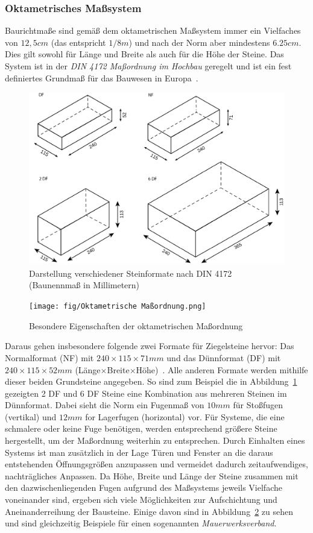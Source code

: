 \subsubsection*{Oktametrisches Maßsystem}
Baurichtmaße sind gemäß dem oktametrischen Maßsystem immer ein Vielfaches von \(12,5 cm\) (das entspricht \(1/8 m\)) und nach der Norm aber mindestens \(6.25cm\).
Dies gilt sowohl für Länge und Breite als auch für die Höhe der Steine.
Das System ist in der \textit{DIN 4172 Maßordnung im Hochbau} geregelt und ist ein fest definiertes Grundmaß für das Bauwesen in Europa~\cite{DIN417224}.
\begin{figure}[ht]
    \centering
    \includegraphics[width=0.8\columnwidth]{fig/Ziegelsteinformate DF NF 2DF 6DF.png}
    \caption{Darstellung verschiedener Steinformate nach DIN 4172 (Baunennmaß in Millimetern)~\cite{Steinfor38:online}}\label{fig:basics:Steinformate}
\end{figure}
\begin{figure}[hb]
  \centering
  \texttt{[image: fig/Oktametrische Maßordnung.png]}
  \caption{Besondere Eigenschaften der oktametrischen Maßordnung~\cite{Moro2021}}\label{fig:basics:OktametrischeMassordnung}
\end{figure}
Daraus gehen insbesondere folgende zwei Formate für Ziegelsteine hervor:
Das Normalformat (NF) mit \(240\times115\times71 mm\) und das Dünnformat (DF) mit \(240\times115\times52 mm\) (Länge$\times$Breite$\times$Höhe)~\cite{Moro2021}.
Alle anderen Formate werden mithilfe dieser beiden Grundsteine angegeben.
So sind zum Beispiel die in Abbildung~\ref{fig:basics:Steinformate} gezeigten 2 DF und 6 DF Steine eine Kombination aus mehreren Steinen im Dünnformat.
Dabei sieht die Norm ein Fugenmaß von \(10 mm\) für Stoßfugen (vertikal) und \(12 mm\) for Lagerfugen (horizontal) vor.
Für Systeme, die eine schmalere oder keine Fuge benötigen, werden entsprechend größere Steine hergestellt, um der Maßordnung weiterhin zu entsprechen.
Durch Einhalten eines Systems ist man zusätzlich in der Lage Türen und Fenster an die daraus entstehenden Öffnungsgrößen anzupassen und vermeidet dadurch zeitaufwendiges, nachträgliches Anpassen.
Da Höhe, Breite und Länge der Steine zusammen mit den dazwischenliegenden Fugen aufgrund des Maßsystems jeweils Vielfache voneinander sind, ergeben sich viele Möglichkeiten zur Aufschichtung und Aneinanderreihung der Bausteine.
Einige davon sind in Abbildung~\ref{fig:basics:OktametrischeMassordnung} zu sehen und sind gleichzeitig Beispiele für einen sogenannten \textit{Mauerwerksverband}.

